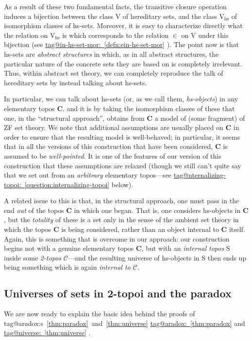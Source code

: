 \documentclass{amsart}
\makeatletter
\newcommand\bC{\mathbf{C}}
\newcommand\cC{\mathcal{C}}
\newcommand\hs{\mathrm{hs}}
\newcommand\rS{\mathrm{S}}
\newcommand\rV{\mathrm{V}}
\newcommand\tagword[1]{\csname tag@#1\endcsname}
\def\label@tag#1:#2\@nil{#1}
\newcommand\labeltag[1]{\label@tag#1:\@nil}
\newcommand\jref[1]{%
  \texorpdfstring%
    {\hyperref[#1]{\tagword{\labeltag{#1}}~\ref*{#1}}}%
    {\tagword{\labeltag{#1}}~\ref*{#1}}%
}
\newcommand\jrefs[2]{%
  \ifthenelse{\equal{\labeltag{#1}}{\labeltag{#2}}}%
  {%
    \texorpdfstring%
      {\tagword{\labeltag{#1}}s~\ref{#1}~and~\ref{#2}}%
      {\tagword{\labeltag{#1}}s~\ref*{#1}~and~\ref*{#2}}%
  }{\jref{#1} and \jref{#2}}%
}
\theoremstyle{definition}
\theoremstyle{remark}
\theoremstyle{plainwithref}
\makeatother
\begin{document}
As a result of these two fundamental facts, the transitive closure operation induces a bijection between the class \( \rV \) of hereditary sets, and the class \( \rV_\hs \) of isomorphism classes of hs-sets.
Moreover, it is easy to characterize directly what the relation on \( \rV_\hs \) is which corresponds to the relation \( \in \) on \( \rV \) under this bijection (see \jref{defn:ein-hs-set-mor}).
The point now is that hs-sets are \emph{abstract structures} in which, as in all abstract structures, the particular nature of the concrete sets they are based on is completely irrelevant.
Thus, within abstract set theory, we can completely reproduce the talk of hereditary sets by instead talking about hs-sets.

In particular, we can talk about hs-sets (or, as we call them, \emph{hs-objects}) in any elementary topos \( \bC \), and it is by taking the isomorphism classes of these that one, in the ``structural approach'', obtains from \( \bC \) a model of (some fragment) of ZF set theory.
We note that additional assumptions are usually placed on \( \bC \) in order to ensure that the resulting model is well-behaved; in particular, it seems that in all the versions of this construction that have been considered, \( \bC \) is assumed to be \emph{well-pointed}.
It is one of the features of our version of this construction that these assumptions are relaxed (though we still can't quite say that we set out from an \emph{arbitrary} elementary topos---see \jref{question:internalizing-topoi} below).

A related issue to this is that, in the structural approach, one must pass in the end \emph{out} of the topos \( \bC \) in which one began.
That is, one considers hs-objects in \( \bC \), but the \emph{totality} of these is a set only in the sense of the ambient set theory in which the topos \( \bC \) is being considered, rather than an object internal to \( \bC \) itself.
Again, this is something that is overcome in our approach: our construction begins not with a genuine elementary topos \( \bC \), but with an \emph{internal topos} \( \rS \) inside some \emph{2-topos} \( \cC \)---and the resulting universe of hs-objects in \( \rS \) then ends up being something which is again \emph{internal to \( \cC \)}.

\subsection{Universes of sets in 2-topoi and the paradox} \label{subsec:unis-and-paradox}
We are now ready to explain the basic idea behind the proofs of \jrefs{thm:paradox}{thm:universe}.
\end{document}
